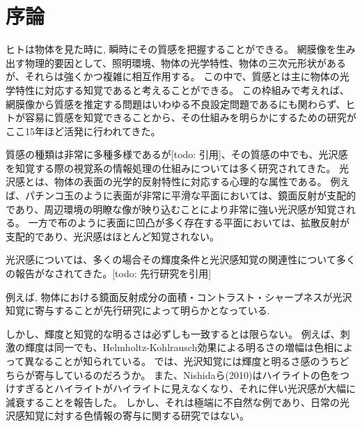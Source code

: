 \chapter{序論}

    ヒトは物体を見た時に, 瞬時にその質感を把握することができる。
    網膜像を生み出す物理的要因として、照明環境、物体の光学特性、物体の三次元形状があるが、それらは強くかつ複雑に相互作用する。
    この中で、質感とは主に物体の光学特性に対応する知覚であると考えることができる。
    この枠組みで考えれば、網膜像から質感を推定する問題はいわゆる不良設定問題であるにも関わらず、ヒトが容易に質感を知覚できることから、その仕組みを明らかにするための研究がここ15年ほど活発に行われてきた。

    質感の種類は非常に多種多様であるが[todo: 引用]、その質感の中でも、光沢感を知覚する際の視覚系の情報処理の仕組みについては多く研究されてきた。
    光沢感とは、物体の表面の光学的反射特性に対応する心理的な属性である。
    例えば、パチンコ玉のように表面が非常に平滑な平面においては、鏡面反射が支配的であり、周辺環境の明瞭な像が映り込むことにより非常に強い光沢感が知覚される。
    一方で布のように表面に凹凸が多く存在する平面においては、拡散反射が支配的であり、光沢感はほとんど知覚されない。

    光沢感については、多くの場合その輝度条件と光沢感知覚の関連性について多くの報告がなされてきた。[todo: 先行研究を引用]

    例えば, 物体における鏡面反射成分の面積・コントラスト・シャープネスが光沢知覚に寄与することが先行研究によって明らかとなっている.


    
    しかし、輝度と知覚的な明るさは必ずしも一致するとは限らない。
    例えば、刺激の輝度は同一でも、Helmholtz-Kohlrausch効果による明るさの増幅は色相によって異なることが知られている。
    では、光沢知覚には輝度と明るさ感のうちどちらが寄与しているのだろうか。
    また、Nishidaら(2010)はハイライトの色をつけすぎるとハイライトがハイライトに見えなくなり、それに伴い光沢感が大幅に減衰することを報告した。
    しかし、それは極端に不自然な例であり、日常の光沢感知覚に対する色情報の寄与に関する研究ではない。